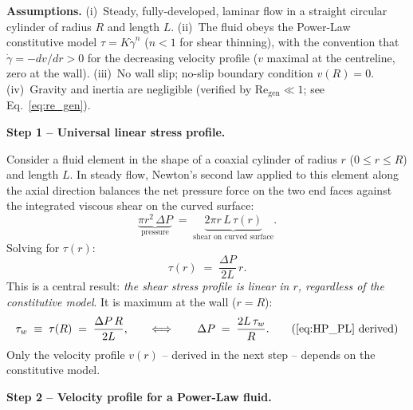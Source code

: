 \documentclass[11pt,a4paper]{article}
\newcommand{\gd}{\dot{\gamma}}
\newcommand{\Rey}{\mathrm{Re}}
\begin{document}
\begin{derivationbox}[title={DERIVATION --- Power-Law pipe flow: velocity profile, $Q(\tau_w)$, and inversion to $\tau_w(Q)$}]

\textbf{Assumptions.}
(i)~Steady, fully-developed, laminar flow in a straight circular cylinder
of radius $R$ and length $L$.
(ii)~The fluid obeys the Power-Law constitutive model $\tau=K\gd^n$
($n<1$ for shear thinning), with the convention that
$\gd=-dv/dr>0$ for the decreasing velocity profile ($v$ maximal at
the centreline, zero at the wall).
(iii)~No wall slip; no-slip boundary condition $v(R)=0$.
(iv)~Gravity and inertia are negligible (verified by $\Rey_\mathrm{gen}\ll 1$;
see Eq.~\ref{eq:re_gen}).

\medskip\noindent\textbf{Step 1 -- Universal linear stress profile.}

Consider a fluid element in the shape of a coaxial cylinder of radius $r$
($0\leq r\leq R$) and length $L$. In steady flow, Newton's second law
applied to this element along the axial direction balances the net pressure
force on the two end faces against the integrated viscous shear on the
curved surface:
\[
\underbrace{\pi r^2\,\Delta P}_{\text{pressure}} \;=\;
\underbrace{2\pi r\,L\,\tau(r)}_{\text{shear on curved surface}}.
\]
Solving for $\tau(r)$:
\begin{equation}
\tau(r) \;=\; \frac{\Delta P}{2L}\,r.
\label{eq:tau_linear}
\end{equation}
This is a central result: \emph{the shear stress profile is linear in $r$,
regardless of the constitutive model}. It is maximum at the wall
($r=R$):
\begin{equation}
\tau_w \;\equiv\; \tau(R) \;=\; \frac{\Delta P\,R}{2L},
\qquad\Longleftrightarrow\qquad
\Delta P \;=\; \frac{2L\,\tau_w}{R}.
\tag{\ref{eq:HP_PL} derived}
\end{equation}
Only the velocity profile $v(r)$ -- derived in the next step -- depends on
the constitutive model.

\medskip\noindent\textbf{Step 2 -- Velocity profile for a Power-Law fluid.}


\end{derivationbox}
\end{document}
